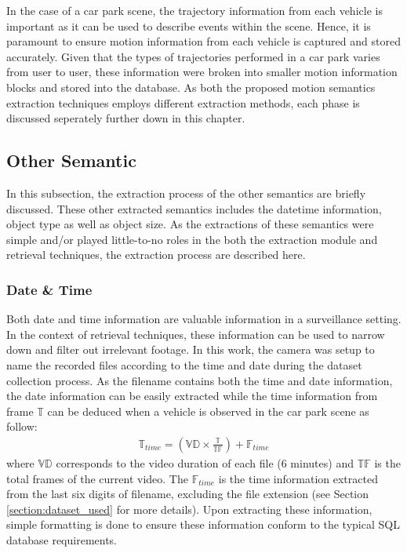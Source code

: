In the case of a car park scene, the trajectory information from each vehicle is important as it can be used to describe events within the scene.
Hence, it is paramount to ensure motion information from each vehicle is captured and stored accurately.
Given that the types of trajectories performed in a car park varies from user to user, these information were broken into smaller motion information blocks and stored into the database. %
As both the proposed motion semantics extraction techniques employs different extraction methods, each phase is discussed seperately further down in this chapter.

\subsection{Other Semantic}

In this subsection, the extraction process of the other semantics are briefly discussed. These other extracted semantics includes the datetime information, object type as well as object size. As the extractions of these semantics were simple and/or played little-to-no roles in the both the extraction module and retrieval techniques, the extraction process are described here.

\subsubsection{Date \& Time}

Both date and time information are valuable information in a surveillance setting. In the context of retrieval techniques, these information can be used to narrow down and filter out irrelevant footage. In this work, the camera was setup to name the recorded files according to the time and date during the dataset collection process. As the filename contains both the time and date information, the date information can be easily extracted while the time information from frame $\mathbb{T}$ can be deduced when a vehicle is observed in the car park scene as follow:
\begin{align}
    \mathbb{T}_{time}  = (\mathbb{VD} \times \frac{\mathbb{T}}{\mathbb{TF}}) + \mathbb{F}_{time}
\end{align}
where $\mathbb{VD}$ corresponds to the video duration of each file (6 minutes) and $\mathbb{TF}$ is the total frames of the current video. The $\mathbb{F}_{time}$ is the time information extracted from the last six digits of filename, excluding the file extension (see Section \ref{section:dataset_used} for more details). Upon extracting these information, simple formatting is done to ensure these information conform to the typical SQL database requirements.


